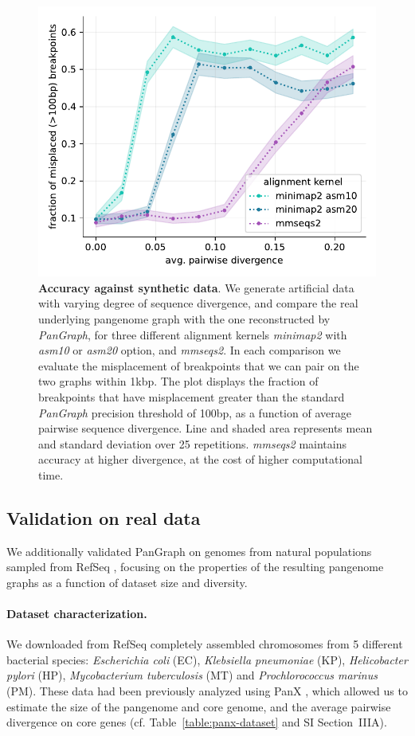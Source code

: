 \documentclass[aps,rmp,reprint,superscriptaddress,notitlepage,10pt]{revtex4-1}
\begin{document}
\begin{figure}[tb]
    \includegraphics[width=.4\textwidth]{figs/misplaced_fraction_vs_divergence.pdf}
    \caption{{\bf Accuracy against synthetic data}.
        We generate artificial data with varying degree of sequence divergence, and compare the real underlying pangenome graph with the one reconstructed by \textit{PanGraph}, for three different alignment kernels \textit{minimap2} with \textit{asm10} or \textit{asm20} option, and \textit{mmseqs2}. In each comparison we evaluate the misplacement of breakpoints that we can pair on the two graphs within 1kbp. The plot displays the fraction of breakpoints that have misplacement greater than the standard \textit{PanGraph} precision threshold of 100bp, as a function of average pairwise sequence divergence. Line and shaded area represents mean and standard deviation over 25 repetitions. \textit{mmseqs2} maintains accuracy at higher divergence, at the cost of higher computational time.
    }
    \label{fig:toy-accuracy}
\end{figure}


\subsection{Validation on real data}

We additionally validated PanGraph on genomes from natural populations sampled from RefSeq \cite{o2016reference}, focusing on the properties of the resulting pangenome graphs as a function of dataset size and diversity.

\paragraph*{Dataset characterization.}
We downloaded from RefSeq \cite{o2016reference} completely assembled chromosomes from 5 different bacterial species: \textit{Escherichia coli} (EC), \textit{Klebsiella pneumoniae} (KP), \textit{Helicobacter pylori} (HP), \textit{Mycobacterium tuberculosis} (MT) and \textit{Prochlorococcus marinus} (PM). These data had been previously analyzed using PanX \cite{ding2018panx}, which allowed us to estimate the size of the pangenome and core genome, and the average pairwise divergence on core genes (cf. Table~\ref{table:panx-dataset} and SI Section~IIIA).
\end{document}
